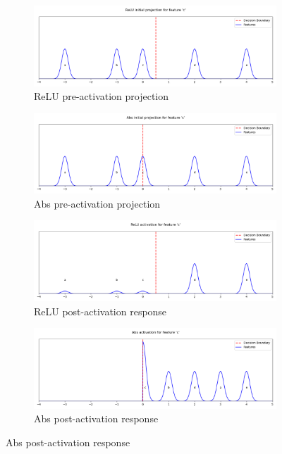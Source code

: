 \begin{figure}[t]
    \centering

    \begin{subfigure}[b]{0.49\textwidth}
    \centering
    \includegraphics[width=\textwidth]{images/activation_demo_relu_pre}
    \caption{ReLU pre-activation projection}
    \label{fig:relu_pre}
    \end{subfigure}
    \hfill
    \begin{subfigure}[b]{0.49\textwidth}
    \centering
    \includegraphics[width=\textwidth]{images/activation_demo_abs_pre}
    \caption{Abs pre-activation projection}
    \label{fig:abs_pre}
    \end{subfigure}

    \begin{subfigure}[b]{0.49\textwidth}
        \centering
        \includegraphics[width=\textwidth]{images/activation_demo_relu_post}
        \caption{ReLU post-activation response}
        \label{fig:relu_post}
    \end{subfigure}
    \hfill
    \begin{subfigure}[b]{0.49\textwidth}
        \centering
        \includegraphics[width=\textwidth]{images/activation_demo_abs_post}
        \caption{Abs post-activation response}
        \label{fig:abs_post}
    \end{subfigure}


\end{figure}
